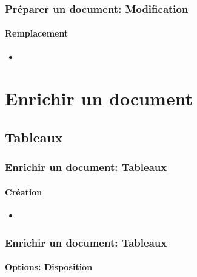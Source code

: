 \documentclass[xcolor=table]{beamer}
\begin{document}
\begin{frame}[t]
\frametitle{Préparer un document: Modification}
\framesubtitle{Remplacement}

\begin{minipage}{0.38\textwidth}
	\begin{itemize}
		\item 
	\end{itemize}
\end{minipage}
\begin{minipage}{0.6\textwidth}	
	\begin{flushright}
	\end{flushright}

	\vspace{-12pt}
\end{minipage}

\end{frame}

\section{Enrichir un document}

%

\subsection{Tableaux}


\begin{frame}
\frametitle{Enrichir un document: Tableaux}
\framesubtitle{Création}

\begin{minipage}{0.70\textwidth}
	\begin{itemize}
		\item 
	\end{itemize}
\end{minipage}
\begin{minipage}{0.28\textwidth}	
\end{minipage}

\end{frame}

\begin{frame}[t]
\frametitle{Enrichir un document: Tableaux}
\framesubtitle{Options: Disposition}


\end{frame}
\end{document}
